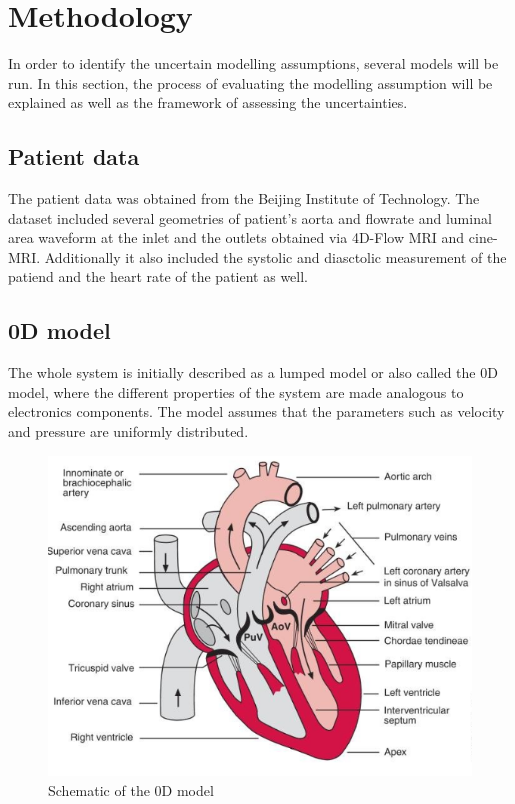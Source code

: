 \chapter{Methodology}
\label{chapterlabel5}
In order to identify the uncertain modelling assumptions, several models will be run. In this section, the process of evaluating the modelling assumption will be explained as well as the framework of assessing the uncertainties.

\section{Patient data}
The patient data was obtained from the Beijing Institute of Technology. The dataset included several geometries of patient's aorta and flowrate and luminal area waveform at the inlet and the outlets obtained via 4D-Flow MRI and cine-MRI. Additionally it also included the systolic and diasctolic measurement of the patiend and the heart rate of the patient as well. \par 

\section{0D model}
The whole system is initially described as a lumped model or also called the 0D model, where the different properties of the system are made analogous to electronics components. The model assumes that the parameters such as velocity and pressure are uniformly distributed. \par

\begin{figure}[ht!]
  \centering
  \includegraphics[draft]{Figures/heart}
  \caption{Schematic of the 0D model}
  \label{fig:0d}
\end{figure}

